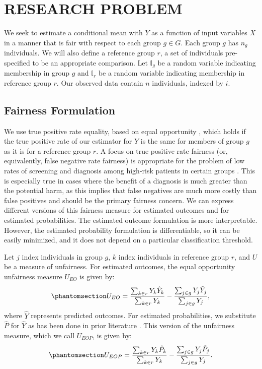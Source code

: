 \documentclass[
  12pt]{article}
\begin{document}
\section{RESEARCH PROBLEM}\label{sec-rp}

We seek to estimate a conditional mean with \(Y\) as a function of input
variables \(X\) in a manner that is fair with respect to each group
\(g \in G\). Each group \(g\) has \(n_g\) individuals. We will also
define a reference group \(r\), a set of individuals pre-specified to be
an appropriate comparison. Let \(\mathbb{I}_{g}\) be a random variable
indicating membership in group \(g\) and \(\mathbb{I}_{r}\) be a random
variable indicating membership in reference group \(r\). Our observed
data contain \(n\) individuals, indexed by \(i\).

\subsection{Fairness Formulation}\label{fairness-formulation}

We use true positive rate equality, based on equal opportunity
\citep{hardt_equality_2016}, which holds if the true positive rate of
our estimator for \(Y\) is the same for members of group \(g\) as it is
for a reference group \(r\). A focus on true positive rate fairness (or,
equivalently, false negative rate fairness) is appropriate for the
problem of low rates of screening and diagnosis among high-risk patients
in certain groups \citep{seyyed-kalantari_underdiagnosis_2021}. This is
especially true in cases where the benefit of a diagnosis is much
greater than the potential harm, as this implies that false negatives
are much more costly than false positives and should be the primary
fairness concern. We can express different versions of this fairness
measure for estimated outcomes and for estimated probabilities. The
estimated outcome formulation is more interpretable. However, the
estimated probability formulation is differentiable, so it can be easily
minimized, and it does not depend on a particular classification
threshold.

Let \(j\) index individuals in group \(g\), \(k\) index individuals in
reference group \(r\), and \(U\) be a measure of unfairness. For
estimated outcomes, the equal opportunity unfairness measure \(U_{EO}\)
is given by: \begin{equation}\phantomsection\label{eq-fair-yhat}{
U_{EO} = \frac{\sum_{k \in r} Y_k \hat Y_k}{\sum_{k \in r} Y_k} - \frac{\sum_{j\in g}Y_j \hat Y_j}{\sum_{j\in g}Y_j},
}\end{equation} where \(\hat{Y}\) represents predicted outcomes. For
estimated probabilities, we substitute \(\hat P\) for \(\hat Y\) as has
been done in prior literature \citep{wang_enhancing_2025}. This version
of the unfairness measure, which we call \(U_{EOP}\), is given by:
\begin{equation}\phantomsection\label{eq-fair-phat}{
U_{EOP} = \frac{\sum_{k \in r} Y_k \hat P_k}{\sum_{k \in r} Y_k} - \frac{\sum_{j\in g}Y_j \hat P_j}{\sum_{j\in g}Y_j}.
}\end{equation}
\end{document}
